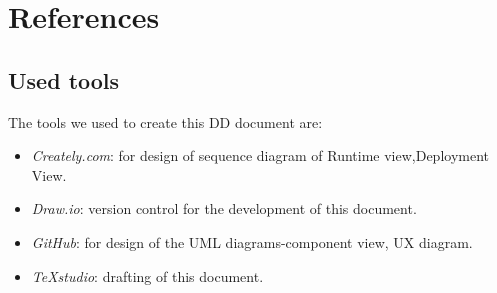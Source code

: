 \chapter{References}

\section{Used tools}
The tools we used to create this DD document are:

\begin{itemize}
	\item \emph{Creately.com}: for design of sequence diagram of Runtime view,Deployment View.
	\item \emph{Draw.io}: version control for the development of this document.
	\item \emph{GitHub}: for design of the UML diagrams-component view, UX diagram.
	\item \emph{TeXstudio}: drafting of this document.
\end{itemize}